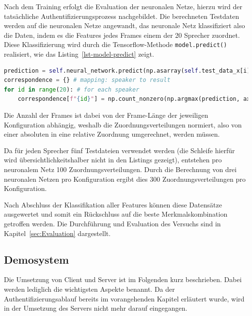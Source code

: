 Nach dem Training erfolgt die Evaluation der neuronalen Netze, hierzu wird der tatsächliche Authentifizierungsprozess nachgebildet.
Die berechneten Testdaten werden auf die neuronalen Netze angewandt, das neuronale Netz klassifiziert also die Daten, indem es die Features jedes Frames einem der 20 Sprecher zuordnet.
Diese Klassifizierung wird durch die Tensorflow-Methode \texttt{model.predict()} realisiert, wie das Listing~\ref{lst-model-predict} zeigt.

\begin{lstlisting}[language=Python,caption=Evaluation mit model.predict und Normalisierung des Ergebnisses,label=lst-model-predict]
prediction = self.neural_network.predict(np.asarray(self.test_data_x[i])) # generate prediction for the sample
correspondence = {} # mapping: speaker to result
for id in range(20): # for each speaker
    correspondence[f"{id}"] = np.count_nonzero(np.argmax(prediction, axis=1) == id) / len(prediction) # normalization
\end{lstlisting}

Die Anzahl der Frames ist dabei von der Frame-Länge der jeweiligen Konfiguration abhängig, weshalb die Zuordnungsverteilungen normiert, also von einer absoluten in eine relative Zuordnung umgerechnet, werden müssen.

Da für jeden Sprecher fünf Testdateien verwendet werden (die Schleife hierfür wird übersichtlichkeitshalber nicht in den Listings gezeigt), entstehen pro neuronalem Netz 100 Zuordnungsverteilungen.
Durch die Berechnung von drei neuronalen Netzen pro Konfiguration ergibt dies 300 Zuordnungsverteilungen pro Konfiguration.

Nach Abschluss der Klassifikation aller Features können diese Datensätze ausgewertet und somit ein Rückschluss auf die beste Merkmalskombination getroffen werden.
Die Durchführung und Evaluation des Versuchs sind in Kapitel~\ref{sec:Evaluation} dargestellt.

\textauthor{\vJB,}{\vLB}{}

\subsection{Demosystem} \label{sec:umsetzung-demo}
Die Umsetzung von Client und Server ist im Folgenden kurz beschrieben.
Dabei werden lediglich die wichtigsten Aspekte benannt.
Da der Authentifizierungsablauf bereits im vorangehenden Kapitel erläutert wurde, wird in der Umsetzung des Servers nicht mehr darauf eingegangen.

